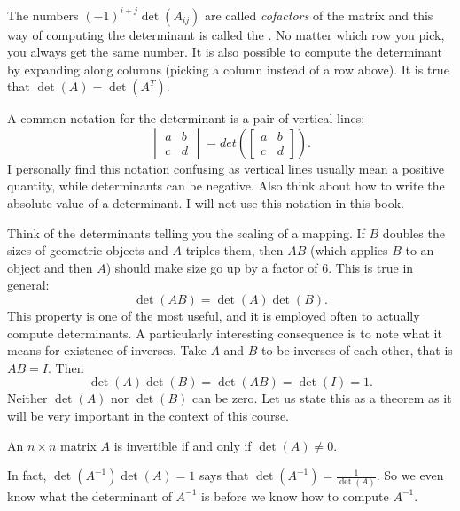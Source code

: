 \documentclass{ximera}
\begin{document}
The numbers ${(-1)}^{i+j}\det(A_{ij})$ are called \emph{cofactors} of the matrix and this way of computing the determinant is called the \emph{}. No matter which row you pick, you always get the same number. It is also possible to compute the determinant by expanding along columns (picking a column instead of a row above). It is true that $\det(A) = \det(A^T)$.

A common notation for the determinant is a pair of vertical lines:
\begin{equation*}
    \begin{vmatrix}
        a & b \\
        c & d
    \end{vmatrix}
    = det \left(
    \begin{bmatrix}
        a & b \\
        c & d
    \end{bmatrix}
    \right) .
\end{equation*}
I personally find this notation confusing as vertical lines usually mean a positive quantity, while determinants can be negative.  Also think about how to write the absolute value of a determinant.  I will not use this notation in this book.

Think of the determinants telling you the scaling of a mapping. If $B$ doubles the sizes of geometric objects and $A$ triples them, then $AB$ (which applies $B$ to an object and then $A$) should make size go up by a factor of $6$.  This is true in general:
\begin{equation*}
    \det(AB) = \det(A)\det(B) .
\end{equation*}
This property is one of the most useful, and it is employed often to actually compute determinants.  A particularly interesting consequence is to note what it means for existence of inverses. Take $A$ and $B$ to be inverses of each other, that is $AB=I$.  Then
\begin{equation*}
    \det(A)\det(B) = \det(AB) = \det(I) = 1 .
\end{equation*}
Neither $\det(A)$ nor $\det(B)$ can be zero. Let us state this as a theorem as it will be very important in the context of this course.

\begin{theorem}{}
    An $n \times n$ matrix $A$ is invertible if and only if $\det (A) \not= 0$.
\end{theorem}

In fact, $\det(A^{-1}) \det(A) = 1$ says that $\det(A^{-1}) = \frac{1}{\det(A)}$.  So we even know what the determinant of $A^{-1}$ is before we know how to compute $A^{-1}$.
\end{document}
